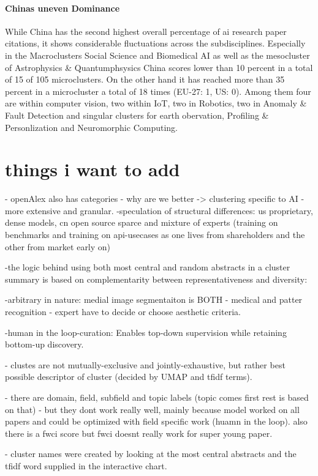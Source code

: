 \documentclass{article}
\begin{document}
\paragraph{Chinas uneven Dominance} While China has the second highest overall percentage of ai research paper citations, it shows considerable fluctuations across the subdisciplines. Especially in the Macroclusters Social Science and Biomedical AI as well as the mesocluster of Astrophysics \& Quantumphsysics China scores lower than 10 percent in a total of 15 of 105 microclusters. On the other hand it has reached more than 35 percent in a microcluster a total of 18 times (EU-27: 1, US: 0). Among them four are within computer vision, two within IoT, two in Robotics, two in Anomaly \& Fault Detection and singular clusters for earth obervation, Profiling \& Personlization and Neuromorphic Computing. 

\section{things i want to add}

- openAlex also has categories - why are we better -> clustering specific to AI - more extensive and granular.
-speculation of structural differences: us proprietary, dense models, cn open source sparce and mixture of experts (training on benchmarks and training on api-usecases as one lives from shareholders and the other from market early on)

-the logic behind using both most central and random abstracts in a cluster summary is based on complementarity between representativeness and diversity:

-arbitrary in nature: medial image segmentaiton is BOTH - medical and patter recognition - expert have to decide or choose aesthetic criteria.

-human in the loop-curation: Enables top-down supervision while retaining bottom-up discovery.

- clustes are not mutually-exclusive and jointly-exhaustive, but rather best possible descriptor of cluster (decided by UMAP and tfidf terms). 

- there are domain, field, subfield and topic labels (topic comes first rest is based on that) - but they dont work really well, mainly because model worked on all papers and could be optimized with field specific work (huamn in the loop). also there is a fwci score but fwci doesnt really work for super young paper.

- cluster names were created by looking at the most central abstracts and the tfidf word supplied in the interactive chart.
\end{document}
